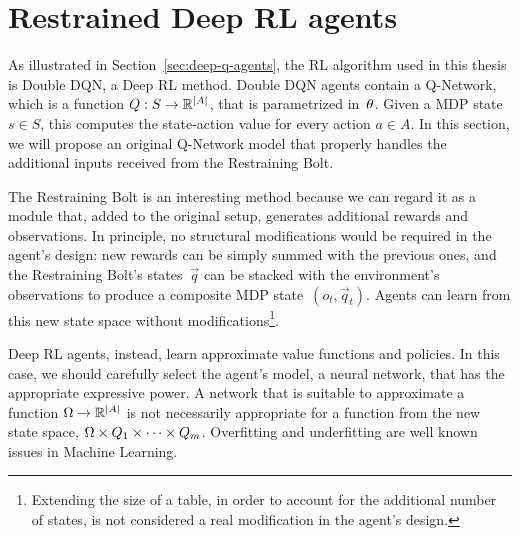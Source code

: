 \begin{comment}
Another possible objection could be that reproducing the environment's reward
function is impossible if it is unknown. This is not necessarily true, because
we are those that define the agent's goal and would generate those
``environment's'' rewards. For an unknown function, we mean that a precise
model of that function is not available and cannot be exploited, not that the
rewarded goal is obscure. For example, the rewards of
Example~\ref{ex:rb-light} are unknown, because we don't know the function that
maps \emph{images} to rewards.

\end{comment}


\section{Restrained Deep RL agents}

\label{sec:rb-deep-model}

As illustrated in Section~\ref{sec:deep-q-agents}, the RL algorithm used in
this thesis is Double DQN, a Deep RL method. Double DQN agents contain a
Q-Network, which is a function $Q: S \to \mathbb{R}^{\lvert A\rvert}$, that is parametrized
in~$\theta$. Given a MDP state~$s \in S$, this computes the state-action
value for every action $a \in A$. In this section, we will propose an original
Q-Network model that properly handles the additional inputs received from the
Restraining Bolt.

The Restraining Bolt is an interesting method because we can regard it as a
module that, added to the original setup, generates additional rewards and
observations. In principle, no structural modifications would be required in
the agent's design: new rewards can be simply summed with the previous ones,
and the Restraining Bolt's states~$\vec{q}$ can be stacked with the
environment's observations to produce a composite MDP state~$(o_t,
\vec{q}_t)$. Agents can learn from this new state space without
modifications\footnote{Extending the size of a table, in order to account for
the additional number of states, is not considered a real modification in the
agent's design.}.

Deep RL agents, instead, learn approximate value functions and policies. In
this case, we should carefully select the agent's model, a neural network,
that has the appropriate expressive power. A network that is suitable to
approximate a function $\Omega \to \mathbb{R}^{\lvert A\rvert}$ is not necessarily appropriate
for a function from the new state space, $\Omega \times Q_1 \times \dots \times
Q_m$. Overfitting and underfitting are well known issues in Machine Learning.


